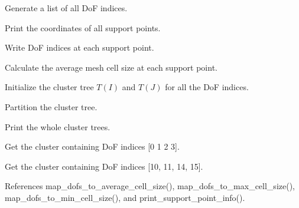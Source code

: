 Generate a list of all DoF indices.

Print the coordinates of all support points.

Write DoF indices at each support point.

Calculate the average mesh cell size at each support point.

Initialize the cluster tree $T(I)$ and $T(J)$ for all the DoF indices.

Partition the cluster tree.

Print the whole cluster trees.

Get the cluster containing DoF indices \mbox{[}0 1 2 3\mbox{]}.

Get the cluster containing DoF indices \mbox{[}10, 11, 14, 15\mbox{]}.

References map\+\_\+dofs\+\_\+to\+\_\+average\+\_\+cell\+\_\+size(), map\+\_\+dofs\+\_\+to\+\_\+max\+\_\+cell\+\_\+size(), map\+\_\+dofs\+\_\+to\+\_\+min\+\_\+cell\+\_\+size(), and print\+\_\+support\+\_\+point\+\_\+info().

